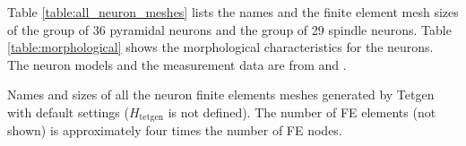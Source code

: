 \documentclass[a4paper]{article}
\begin{document}
Table \ref{table:all_neuron_meshes} lists the names and the finite element mesh sizes of the group of 36 pyramidal neurons and the group of 29 spindle neurons. Table \ref{table:morphological} shows the morphological characteristics for the neurons. The neuron models and the measurement data are from \cite{ascoli9247} and \cite{watson2006dendritic}.

\begin{table}
    
    \caption{Names and sizes of all the neuron finite elements meshes generated by Tetgen with default settings ($H_\text{tetgen}$ is not defined). The number of FE elements (not shown) is approximately four times the number of FE nodes.}
    \label{table:all_neuron_meshes}
\end{table}


\end{document}
